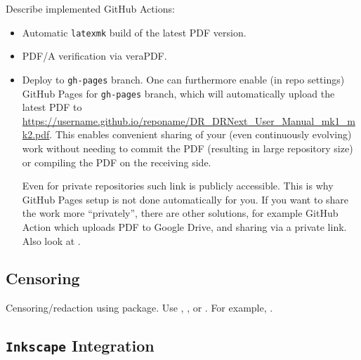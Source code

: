 Describe implemented \textsf{GitHub Actions}:
\begin{itemize}
    \item Automatic \texttt{latexmk} build of the latest PDF version.
    \item PDF/A verification via \textsf{veraPDF}.
    \item Deploy to \texttt{gh-pages} branch.
          One can furthermore enable (in repo settings) \textsf{GitHub Pages} for \texttt{gh-pages} branch, which will automatically upload the latest PDF to \url{https://username.github.io/reponame/DR_DRNext_User_Manual_mk1_mk2.pdf}.
          This enables convenient sharing of your (even continuously evolving) work without needing to commit the PDF (resulting in large repository size) or compiling the PDF on the receiving side.
          \begin{remark}
              Even for private repositories such link is publicly accessible.
              This is why \textsf{GitHub Pages} setup is not done automatically for you.
              If you want to share the work more \enquote{privately}, there are other solutions, for example \textsf{GitHub Action} which uploads PDF to \textsf{Google Drive}, and sharing via a private link.
              Also look at .
          \end{remark}
\end{itemize}

\subsection{Censoring}%
\label{sub:Censoring}

Censoring/redaction using  package.
Use \macro{\censor}, \macro{\blackout}, or \macro{\censorbox}.
For example, .

\subsection{\texorpdfstring{\texttt{Inkscape}}{Inkscape} Integration}%
\label{sub:Inkscape Integration}

